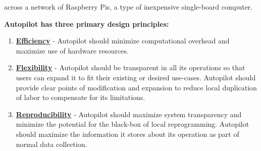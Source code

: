  across a network of Raspberry Pis, a type of inexpensive single-board computer.

\vspace{12pt}

\textbf{Autopilot has three primary design principles:}

\begin{enumerate}
    \item \hyperref[sec:efficiency]{\textbf{Efficiency}} - Autopilot should minimize computational overhead and maximize use of hardware resources.
    \item \hyperref[sec:flexibility]{\textbf{Flexibility}} - Autopilot should be transparent in all its operations so that users can expand it to fit their existing or desired use-cases. Autopilot should provide clear points of modification and expansion to reduce local duplication of labor to compensate for its limitations.
    \item \hyperref[sec:reproducibility]{\textbf{Reproducibility}} - Autopilot should maximize system transparency and minimize the potential for the black-box of local reprogramming. Autopilot should maximize the information it stores about its operation as part of normal data collection.
\end{enumerate}
